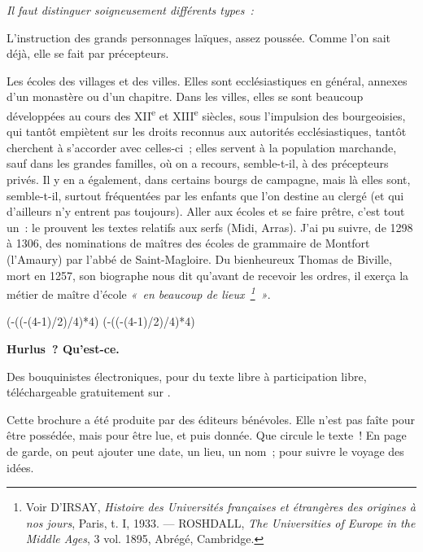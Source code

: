 \documentclass[french,twoside]{book} %
\newlength{\listmod}
\newcommand{\listhead}[1]{\hspace{-1\listmod}\emph{#1}}
\newcommand\chapterclose{} %
\def\truncdiv#1#2{((#1-(#2-1)/2)/#2)}
\def\moduloop#1#2{(#1-\truncdiv{#1}{#2}*#2)}
\def\modulo#1#2{\number\numexpr\moduloop{#1}{#2}\relax}
\begin{document}
\begin{listalpha}[itemsep=0pt,]
\item[]\listhead{Il faut distinguer soigneusement différents types :}
\item L’instruction des grands personnages laïques, assez poussée. Comme l’on sait déjà, elle se fait par précepteurs.
\item Les écoles des villages et des villes. Elles sont ecclésiastiques en général, annexes d’un monastère ou d’un chapitre. Dans les villes, elles se sont beaucoup développées au cours des XII\textsuperscript{e} et XIII\textsuperscript{e} siècles, sous l’impulsion des bourgeoisies, qui tantôt empiètent sur les droits reconnus aux autorités ecclésiastiques, tantôt cherchent à s’accorder avec celles-ci ; elles servent à la population marchande, sauf dans les grandes familles, où on a recours, semble-t-il, à des précepteurs privés. Il y en a également, dans certains bourgs de campagne, mais là elles sont, semble-t-il, surtout fréquentées par les enfants que l’on destine au clergé (et qui d’ailleurs n’y entrent pas toujours). Aller aux écoles et se faire prêtre, c’est tout un : le prouvent les textes relatifs aux serfs (Midi, Arras). J’ai pu suivre, de 1298 à 1306, des nominations de maîtres des écoles de grammaire de Montfort (l’Amaury) par l’abbé de Saint-Magloire. Du bienheureux Thomas de Biville, mort en 1257, son biographe nous dit qu’avant de recevoir les ordres, il exerça la métier de maître d’école \emph{« en beaucoup de lieux \footnote{ Voir D’IRSAY, {\itshape Histoire des Universités françaises et étrangères des origines à nos jours}, Paris, t. I, 1933. — ROSHDALL, {\itshape The Universities of Europe in the Middle Ages}, 3 vol. 1895, Abrégé, Cambridge.} »}.
\end{listalpha}

\chapterclose

 


\ifbooklet
  \pagestyle{empty}
  \clearpage
  \ifnum\modulo{\value{page}}{4}=0 \hbox{}\newpage\hbox{}\newpage\fi
  \ifnum\modulo{\value{page}}{4}=1 \hbox{}\newpage\hbox{}\newpage\fi


  \hbox{}\newpage
  \ifodd\value{page}\hbox{}\newpage\fi
  {\centering\color{rubric}\bfseries\noindent\large
    Hurlus ? Qu’est-ce.\par
    \bigskip
  }
  \noindent Des bouquinistes électroniques, pour du texte libre à participation libre,
  téléchargeable gratuitement sur \href{https://hurlus.fr}{}.\par
  \bigskip
  \noindent Cette brochure a été produite par des éditeurs bénévoles.
  Elle n’est pas faîte pour être possédée, mais pour être lue, et puis donnée.
  Que circule le texte !
  En page de garde, on peut ajouter une date, un lieu, un nom ; pour suivre le voyage des idées.
  \par
\end{document}
